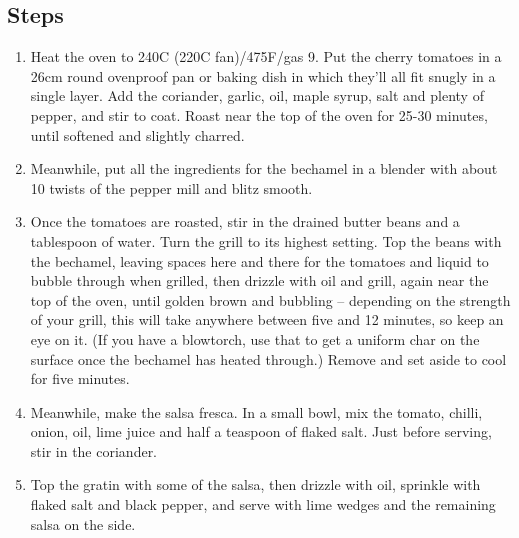 \documentclass{book}
\begin{document}
\subsection*{Steps}
\begin{enumerate}
\item Heat the oven to 240C (220C fan)/475F/gas 9. Put the cherry tomatoes in a 26cm round ovenproof pan or baking dish in which they’ll all fit snugly in a single layer. Add the coriander, garlic, oil, maple syrup, salt and plenty of pepper, and stir to coat. Roast near the top of the oven for 25-30 minutes, until softened and slightly charred.
\item Meanwhile, put all the ingredients for the bechamel in a blender with about 10 twists of the pepper mill and blitz smooth.
\item Once the tomatoes are roasted, stir in the drained butter beans and a tablespoon of water. Turn the grill to its highest setting. Top the beans with the bechamel, leaving spaces here and there for the tomatoes and liquid to bubble through when grilled, then drizzle with oil and grill, again near the top of the oven, until golden brown and bubbling – depending on the strength of your grill, this will take anywhere between five and 12 minutes, so keep an eye on it. (If you have a blowtorch, use that to get a uniform char on the surface once the bechamel has heated through.) Remove and set aside to cool for five minutes.
\item Meanwhile, make the salsa fresca. In a small bowl, mix the tomato, chilli, onion, oil, lime juice and half a teaspoon of flaked salt. Just before serving, stir in the coriander.
\item Top the gratin with some of the salsa, then drizzle with oil, sprinkle with flaked salt and black pepper, and serve with lime wedges and the remaining salsa on the side.
\end{enumerate}
\newpage
\end{document}
